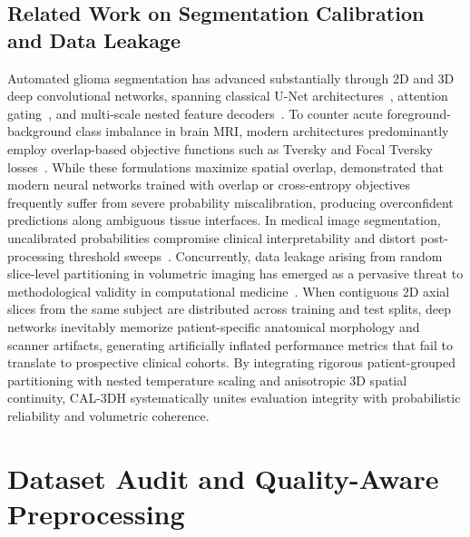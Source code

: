 \documentclass[preprint,12pt,authoryear]{elsarticle}
\begin{document}
\subsection{Related Work on Segmentation Calibration and Data Leakage}
\label{sec:related_work}
Automated glioma segmentation has advanced substantially through 2D and 3D deep convolutional networks, spanning classical U-Net architectures~\citep{ronneberger2015u,buda2019association}, attention gating~\citep{oktay2018attention}, and multi-scale nested feature decoders~\citep{zhou2018unetplusplus}. To counter acute foreground-background class imbalance in brain MRI, modern architectures predominantly employ overlap-based objective functions such as Tversky and Focal Tversky losses~\citep{salehi2017tversky,abraham2019novel}. While these formulations maximize spatial overlap, \citet{guo2017calibration} demonstrated that modern neural networks trained with overlap or cross-entropy objectives frequently suffer from severe probability miscalibration, producing overconfident predictions along ambiguous tissue interfaces. In medical image segmentation, uncalibrated probabilities compromise clinical interpretability and distort post-processing threshold sweeps~\citep{mehrtash2020confidence}. Concurrently, data leakage arising from random slice-level partitioning in volumetric imaging has emerged as a pervasive threat to methodological validity in computational medicine~\citep{wen2020convolutional}. When contiguous 2D axial slices from the same subject are distributed across training and test splits, deep networks inevitably memorize patient-specific anatomical morphology and scanner artifacts, generating artificially inflated performance metrics that fail to translate to prospective clinical cohorts. By integrating rigorous patient-grouped partitioning with nested temperature scaling and anisotropic 3D spatial continuity, CAL-3DH systematically unites evaluation integrity with probabilistic reliability and volumetric coherence.

\section{Dataset Audit and Quality-Aware Preprocessing}
\label{sec:dataset}
\end{document}
